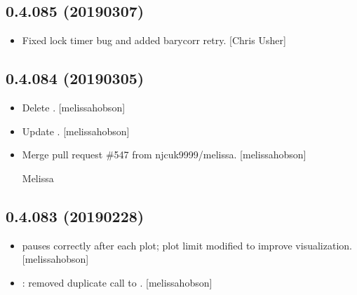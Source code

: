\documentclass[a4paper,10pt,english]{report}
\begin{document}
\subsection{0.4.085 (2019\sphinxhyphen{}03\sphinxhyphen{}07)}
\label{\detokenize{misc/changelog:id194}}\begin{itemize}
\item {} 
Fixed lock timer bug and added barycorr retry. {[}Chris Usher{]}

\end{itemize}


\subsection{0.4.084 (2019\sphinxhyphen{}03\sphinxhyphen{}05)}
\label{\detokenize{misc/changelog:id195}}\begin{itemize}
\item {} 
Delete . {[}melissa\sphinxhyphen{}hobson{]}

\item {} 
Update . {[}melissa\sphinxhyphen{}hobson{]}

\item {} 
Merge pull request \#547 from njcuk9999/melissa. {[}melissa\sphinxhyphen{}hobson{]}

Melissa

\end{itemize}


\subsection{0.4.083 (2019\sphinxhyphen{}02\sphinxhyphen{}28)}
\label{\detokenize{misc/changelog:id196}}\begin{itemize}
\item {} 
 pauses correctly after each plot;
plot limit modified to improve visualization. {[}melissa\sphinxhyphen{}hobson{]}

\item {} 
: removed
duplicate call to . {[}melissa\sphinxhyphen{}hobson{]}

\end{itemize}
\end{document}
